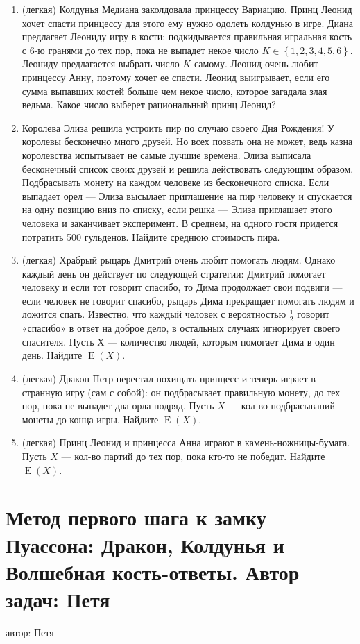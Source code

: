 \documentclass[a4paper,12pt]{article}
\DeclareMathOperator{\E}{E}
\begin{document}
\begin{enumerate} %
\item (легкая) Колдунья Медиана заколдовала принцессу Вариацию. Принц Леонид хочет спасти принцессу для этого ему нужно одолеть колдунью в игре. Диана предлагает Леониду игру в кости: подкидывается правильная игральная кость с 6-ю гранями до тех пор, пока не выпадет некое число $K \in \left\{1,2,3,4,5,6 \right\}$. Леониду предлагается выбрать число $K$ самому. Леонид очень любит принцессу Анну, поэтому хочет ее спасти. Леонид выигрывает, если его сумма выпавших костей больше чем некое число, которое загадала злая ведьма. Какое число выберет рациональный принц Леонид?
\item
Королева Элиза решила устроить пир по случаю своего Дня Рождения!
У королевы бесконечно много друзей. Но всех позвать она не может,
ведь казна королевства испытывает не самые лучшие времена.
Элиза выписала бесконечный список своих друзей и решила действовать следующим образом.
Подбрасывать монету на каждом человеке из бесконечного списка.
Если выпадает орел — Элиза высылает приглашение на пир человеку и спускается на одну позицию вниз по списку,
если решка — Элиза приглашает этого человека и заканчивает эксперимент.
В среднем, на одного гостя придется потратить 500 гульденов.  Найдите среднюю стоимость пира.
\item (легкая)
Храбрый рыцарь Дмитрий очень любит помогать людям. Однако каждый день он действует по следующей стратегии: Дмитрий помогает человеку и если тот говорит спасибо, 
то Дима продолжает свои подвиги — если человек не говорит спасибо, рыцарь Дима прекращает помогать людям и ложится спать. Известно, что каждый человек с вероятностью $\frac{1}{2}$ говорит «спасибо» в ответ на доброе дело, в остальных случаях игнорирует своего спасителя. Пусть $Х$ — количество людей, которым помогает Дима в один день. Найдите $\E(X)$.
\item (легкая) Дракон Петр перестал похищать принцесс и теперь играет в странную игру (сам с собой): он подбрасывает правильную монету, до тех пор, пока не выпадет два орла подряд. Пусть $X$ — кол-во подбрасываний монеты до конца игры. Найдите $\E(X)$.
\item (легкая) Принц Леонид и принцесса Анна играют в камень-ножницы-бумага.
Пусть $X$ — кол-во партий до тех пор, пока кто-то не победит. Найдите $\E(X)$.
\end{enumerate}

\newpage
\section{Метод первого шага к замку Пуассона: Дракон, Колдунья и Волшебная кость-ответы. Автор задач: Петя}
автор: Петя
\end{document}
